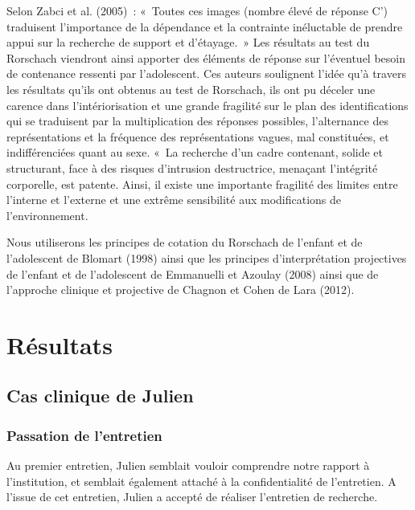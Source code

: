 \documentclass[12pt, a4paper]{book}
\begin{document}
\begin{spacing}{1.5}
Selon Zabci et al. (2005) : « Toutes ces images (nombre élevé de réponse C') traduisent l'importance de la dépendance et la contrainte inéluctable de prendre appui sur la recherche de support et d'étayage. » Les résultats au test du Rorschach viendront ainsi apporter des éléments de réponse sur l'éventuel besoin de contenance ressenti par l'adolescent. Ces auteurs soulignent l'idée qu'à travers les résultats qu'ils ont obtenus au test de Rorschach, ils ont pu déceler une carence dans l'intériorisation et une grande fragilité sur le plan des identifications qui se traduisent par la multiplication des réponses possibles, l'alternance des représentations et la fréquence des représentations vagues, mal constituées, et indifférenciées quant au sexe. « La recherche d'un cadre contenant, solide et structurant, face à des risques d'intrusion destructrice, menaçant l'intégrité corporelle, est patente. Ainsi, il existe une importante fragilité des limites entre l'interne et l'externe et une extrême sensibilité aux modifications de l'environnement. 

Nous utiliserons les principes de cotation du Rorschach de l'enfant et de l'adolescent de Blomart (1998) ainsi que les principes d'interprétation projectives de l'enfant et  de l'adolescent de Emmanuelli et Azoulay (2008) ainsi que  de l'approche clinique et projective de Chagnon et Cohen de Lara (2012).

\chapter{Résultats}

\section{Cas clinique de Julien}

\subsection{Passation de l'entretien}

Au premier entretien, Julien semblait vouloir comprendre notre rapport à l'institution, et semblait également attaché à la confidentialité de l'entretien. A l'issue de cet entretien, Julien a accepté de réaliser l'entretien de recherche.


\end{spacing}
\end{document}
